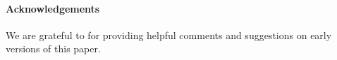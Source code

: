 \paragraph{Acknowledgements}
We are grateful to
\iftoggle{BLIND}{[list of colleagues left out of the anonymised version]}
{Conor McBride for discussions pertaining to the fine details
of the unsafe encoding used in TypOS, as well as James McKinna,
Fredrik Nordvall Forsberg,
Ohad Kammar,
and Jacques Carette}
for providing helpful comments and suggestions on early
versions of this paper.
